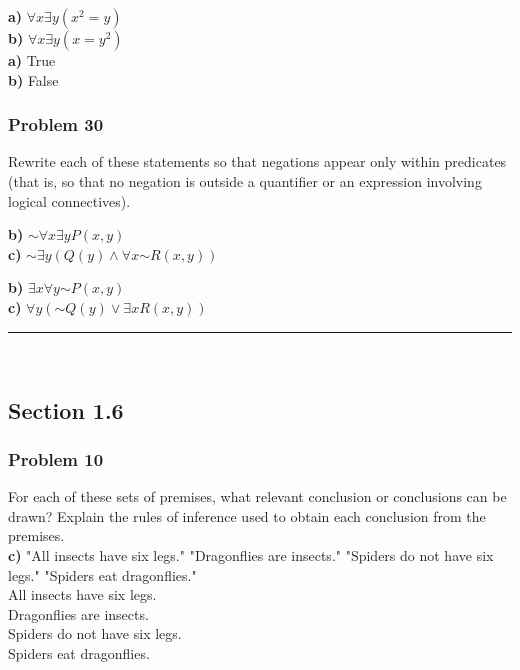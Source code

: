 \documentclass[paper=a4, fontsize=11pt]{scrartcl} %
\newcommand*{\oldneg}{\mathord{\sim}}
\newcommand{\horrule}[1]{\rule{\linewidth}{#1}} %
\begin{document}
\textbf{a)} $\forall x \exists y(x^2 = y)$\\
\textbf{b)} $\forall x \exists y(x = y^2)$\\

\textbf{a)} True\\
\textbf{b)} False

\subsubsection*{Problem 30}
Rewrite each of these statements so that negations appear 
only within predicates (that is, so that no negation
is outside a quantifier or an expression involving logical
connectives).

\textbf{b)} $\oldneg \forall x \exists y P(x, y)$\\
\textbf{c)} $\oldneg \exists y(Q(y) \land \forall x \oldneg R(x, y))$


\textbf{b)} $\exists x \forall y \oldneg P(x, y)$\\
\textbf{c)} $\forall y(\oldneg Q(y) \lor \exists x R(x, y))$\\


\horrule{0.5pt} \\ %
\subsection*{Section 1.6}
\subsubsection*{Problem 10}
For each of these sets of premises, what relevant conclusion 
or conclusions can be drawn? Explain the rules of inference 
used to obtain each conclusion from the premises.\\

\textbf{c)} 
"All insects have six legs." "Dragonflies are insects."
"Spiders do not have six legs." "Spiders eat dragonflies."\\

All insects have six legs.\\
Dragonflies are insects.\\
Spiders do not have six legs.\\
Spiders eat dragonflies.\\
\end{document}
